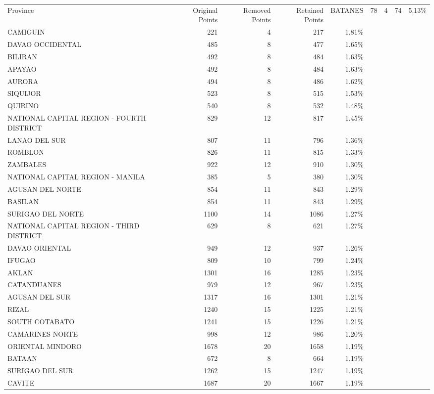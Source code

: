 \begin{tabular}{lrrrr}
\toprule
Province & Original Points & Removed Points & Retained Points & %
\midrule
BATANES & 78 & 4 & 74 & 5.13\% \\
CAMIGUIN & 221 & 4 & 217 & 1.81\% \\
DAVAO OCCIDENTAL & 485 & 8 & 477 & 1.65\% \\
BILIRAN & 492 & 8 & 484 & 1.63\% \\
APAYAO & 492 & 8 & 484 & 1.63\% \\
AURORA & 494 & 8 & 486 & 1.62\% \\
SIQUIJOR & 523 & 8 & 515 & 1.53\% \\
QUIRINO & 540 & 8 & 532 & 1.48\% \\
NATIONAL CAPITAL REGION - FOURTH DISTRICT & 829 & 12 & 817 & 1.45\% \\
LANAO DEL SUR & 807 & 11 & 796 & 1.36\% \\
ROMBLON & 826 & 11 & 815 & 1.33\% \\
ZAMBALES & 922 & 12 & 910 & 1.30\% \\
NATIONAL CAPITAL REGION - MANILA & 385 & 5 & 380 & 1.30\% \\
AGUSAN DEL NORTE & 854 & 11 & 843 & 1.29\% \\
BASILAN & 854 & 11 & 843 & 1.29\% \\
SURIGAO DEL NORTE & 1100 & 14 & 1086 & 1.27\% \\
NATIONAL CAPITAL REGION - THIRD DISTRICT & 629 & 8 & 621 & 1.27\% \\
DAVAO ORIENTAL & 949 & 12 & 937 & 1.26\% \\
IFUGAO & 809 & 10 & 799 & 1.24\% \\
AKLAN & 1301 & 16 & 1285 & 1.23\% \\
CATANDUANES & 979 & 12 & 967 & 1.23\% \\
AGUSAN DEL SUR & 1317 & 16 & 1301 & 1.21\% \\
RIZAL & 1240 & 15 & 1225 & 1.21\% \\
SOUTH COTABATO & 1241 & 15 & 1226 & 1.21\% \\
CAMARINES NORTE & 998 & 12 & 986 & 1.20\% \\
ORIENTAL MINDORO & 1678 & 20 & 1658 & 1.19\% \\
BATAAN & 672 & 8 & 664 & 1.19\% \\
SURIGAO DEL SUR & 1262 & 15 & 1247 & 1.19\% \\
CAVITE & 1687 & 20 & 1667 & 1.19\% \\

\end{tabular}
